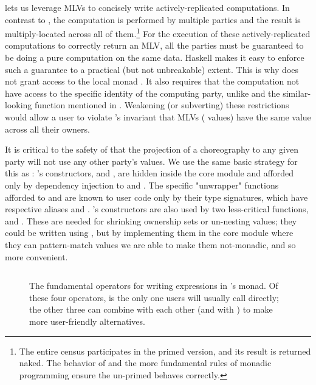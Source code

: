  lets us leverage MLVs to concisely write actively-replicated computations.
In contrast to , the computation is performed by multiple parties
and the result is multiply-located across all of them.\footnote{
    The entire census participates in the primed version, and its result is returned naked.
    The behavior of  and the more fundamental rules of monadic programming
    ensure the un-primed  behaves correctly.
}
For the execution of these actively-replicated computations to correctly return an MLV,
all the parties must be guaranteed to be doing a pure computation on the same data.
Haskell makes it easy to enforce such a guarantee to a practical (but not unbreakable) extent.
This is why  does not grant access to the local monad .
It also requires that the computation not have access to the specific identity of the computing party,
unlike  and the similar-looking function  mentioned in .
Weakening (or subverting) these restrictions would allow a user to violate \MultiChor's invariant that MLVs ( values)
have the same value across all their owners.

It is critical to the safety of \MultiChor that the projection of a choreography to any given party will not use
any other party's  values.
We use the same basic strategy for this as \HasChor:
's constructors,  and , are hidden inside the core module
and afforded only by dependency injection to  and .
The specific "unwrapper" functions afforded to  and 
are known to user code only by their type signatures, which have respective aliases  and .
's constructors are also used by two less-critical functions,  and .
These are needed for shrinking ownership sets or un-nesting  values;
they could be written using ,
but by implementing them in the core module where they can pattern-match  values we are able to make them not-monadic,
and so more convenient.

\begin{figure*}[tbhp]
  \begin{mdframed}
    \inputminted[xleftmargin=10pt,linenos,fontsize=\scriptsize]{haskell}{figures/operators-multichor.hs.txt}
    \caption{
        The fundamental operators for writing expressions in \MultiChor's  monad.
        Of these four operators,  is the only one users will usually call directly;
        the other three can combine with each other (and with ) to make more user-friendly alternatives.
    }
    \label{fig:operators-multichor}
  \end{mdframed}
\end{figure*}

